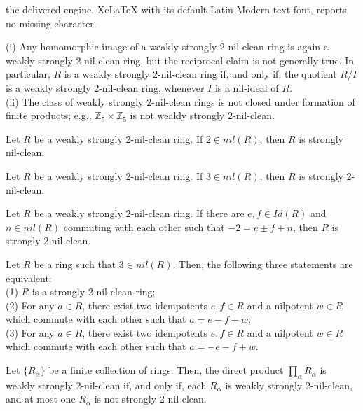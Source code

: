 \documentclass[10pt,a4paper]{amsart}
\begin{document}
the delivered engine, XeLaTeX with its default Latin Modern text font, reports no missing character.
\begin{proposition}\label{hom} {\rm (i)} Any homomorphic image of a weakly strongly 2-nil-clean ring is again a weakly strongly 2-nil-clean ring, but the reciprocal claim is not generally true. In particular, $R$ is a weakly strongly 2-nil-clean ring if, and only if, the quotient $R/I$ is a weakly strongly 2-nil-clean ring, whenever $I$ is a nil-ideal of $R$.\\\indent
{\rm (ii)} The class of weakly strongly 2-nil-clean rings is not closed under formation of finite products; e.g., $\mathbb{Z}_5 \times \mathbb{Z}_5$ is not weakly strongly 2-nil-clean.
 \end{proposition}

\begin{lemma}\label{2} Let $R$ be a weakly strongly 2-nil-clean ring. If $2\in nil(R)$, then $R$ is strongly nil-clean.
\end{lemma}

\begin{lemma}\label{3} Let $R$ be a weakly strongly 2-nil-clean ring. If $3\in nil(R)$, then $R$ is strongly 2-nil-clean.
\end{lemma}

\begin{lemma}\label{5} Let $R$ be a weakly strongly 2-nil-clean ring. If there are $e,f\in Id(R)$ and $n\in nil(R)$ commuting with each other such that  $-2=e\pm f+n$, then $R$ is strongly 2-nil-clean.
\end{lemma}

\begin{lemma}\label{2nil} Let $R$ be a ring such that $3\in nil(R)$. Then, the following three statements are equivalent:\\\indent (1) $R$ is a strongly 2-nil-clean ring;\\\indent (2) For any $a \in R$, there exist two idempotents $e, f \in R$ and a nilpotent $w\in  R$ which commute with each other such that $a = e - f + w$;\\\indent  (3) For any $a \in R$, there exist two idempotents $e, f \in R$ and a nilpotent $w\in  R$ which commute with each other such that $a = -e - f + w$.
\end{lemma}

\begin{proposition}\label{2.2} Let $\{R_{\alpha}\}$ be a finite collection of rings. Then, the direct product
$\prod_{\alpha} R_{\alpha}$ is weakly strongly 2-nil-clean if, and only if, each $R_{\alpha}$ is weakly strongly 2-nil-clean, and at most one $R_{\alpha}$ is not strongly 2-nil-clean.
\end{proposition}
\end{document}
